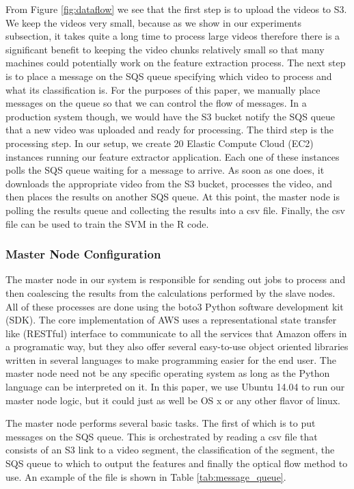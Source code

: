 From Figure \ref{fig:dataflow} we see that the first step is to upload
the videos to S3. We keep the videos very small, because as we show in our experiments
subsection, it takes quite a long time to process large videos therefore there is a
significant benefit to keeping the video chunks relatively small so that many
machines could potentially work on the feature extraction process. The next step
is to place a message on the SQS queue specifying which video to process and
what its classification is. For the purposes of this paper, we manually place
messages on the queue so that we can control the flow of messages. In
a production system though, we would have the S3 bucket notify the SQS queue that
a new video was uploaded and ready for processing. The third step is the processing
step. In our setup, we create 20 Elastic Compute Cloud (EC2) instances running our feature extractor application.
Each one of these instances polls the SQS queue waiting for a message to arrive.
As soon as one does, it downloads the appropriate video from the S3 bucket,
processes the video, and then places the results on another SQS queue. At this
point, the master node is polling the results queue and collecting the results
into a csv file. Finally, the csv file can be used to train the SVM in the R
code.

\subsubsection{\label{subsubsection:master_node}Master Node Configuration}
The master node in our system is responsible for sending out jobs to process and
then coalescing the results from the calculations performed by the slave nodes.
All of these processes are done using the boto3 \cite{boto3} Python  software
development kit (SDK). The core implementation of AWS uses a  representational
state transfer like (RESTful) interface to communicate to all the services that
Amazon offers in a programatic  way, but they also offer several easy-to-use
object oriented libraries written  in several languages to make programming easier
for the end user. The master node
need not be any specific operating system as long as the Python language
can be interpreted on it. In this paper, we use Ubuntu 14.04 to run our master
node logic, but it could just as well be OS x or any other flavor of linux.

The master node performs several basic tasks. The first of which is to put
messages on the SQS queue.  This is orchestrated by reading
a csv file that consists of an S3 link to a video segment, the classification of
the segment, the SQS queue to which to output the features and finally the
optical flow method to use. An example of the file is shown in Table
 \ref{tab:message_queue}.


